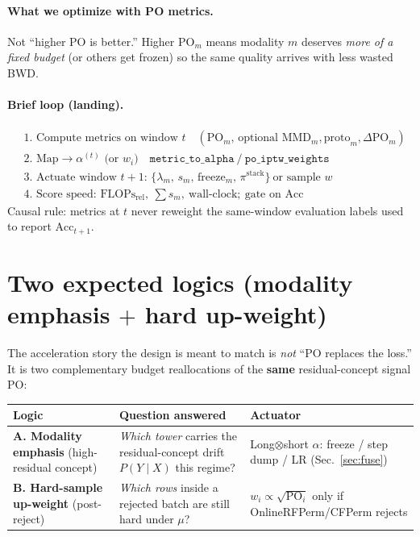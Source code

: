\documentclass[11pt]{article}
\newcommand{\PO}{\mathrm{PO}}
\newcommand{\MMD}{\mathrm{MMD}}
\newcommand{\Acc}{\mathrm{Acc}}
\newcommand{\Flops}{\mathrm{FLOPs}_{\mathrm{rel}}}
\begin{document}
\paragraph{What we optimize with PO metrics.}
Not ``higher PO is better.''
Higher $\PO_m$ means modality $m$ deserves \emph{more of a fixed
budget} (or others get frozen) so the same quality arrives with less
wasted BWD.

\paragraph{Brief loop (landing).}
\[
\boxed{
\begin{aligned}
&\text{1. Compute metrics on window }t
  \quad(\PO_m,\,\text{optional }\MMD_m,\mathrm{proto}_m,\Delta\PO_m)\\
&\text{2. Map}\to\alpha^{(t)}\text{ (or }w_i\text{)}
  \quad\texttt{metric\_to\_alpha}\ /\ \texttt{po\_iptw\_weights}\\
&\text{3. Actuate window }t{+}1\text{: }
  \{\lambda_m,\,s_m,\,\mathrm{freeze}_m,\,\pi^{\mathrm{stack}}\}\
  \text{or sample }w\\
&\text{4. Score speed: }\Flops,\ \sum s_m,\ \text{wall-clock};\
  \text{gate on }\Acc
\end{aligned}
}
\]
Causal rule: metrics at $t$ never reweight the same-window evaluation
labels used to report $\Acc_{t+1}$.

\section{Two expected logics (modality emphasis $+$ hard up-weight)}
\label{sec:two-logics}

The acceleration story the design is meant to match is \emph{not}
``PO replaces the loss.'' It is two complementary budget reallocations
of the \textbf{same} residual-concept signal $\PO$:

\begin{center}
\small
\begin{tabular}{@{}p{2.4cm}p{5.2cm}p{4.2cm}@{}}
\toprule
Logic & Question answered & Actuator \\
\midrule
\textbf{A. Modality emphasis}
  (high-residual concept)
  & \emph{Which tower} carries the residual-concept drift
    $P(Y\mid X)$ this regime?
  & Long$\otimes$short $\alpha$:
    freeze / step dump / LR
    (Sec.~\ref{sec:fuse}) \\
\textbf{B. Hard-sample up-weight}
  (post-reject)
  & \emph{Which rows} inside a rejected batch
    are still hard under $\mu$?
  & $w_i\propto\sqrt{\PO_i}$ only if
    OnlineRFPerm/CFPerm rejects \\
\bottomrule
\end{tabular}
\end{center}
\end{document}
